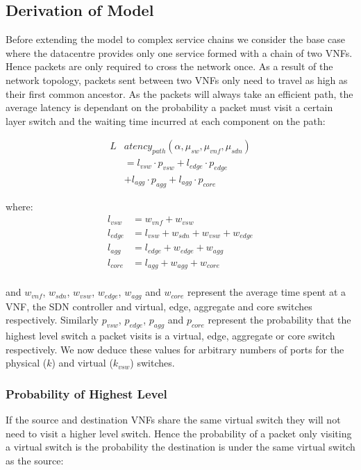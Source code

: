 \subsection{Derivation of Model}
Before extending the model to complex service chains we consider the base case where the datacentre provides only one service formed with a chain of two VNFs. Hence packets are only required to cross the network once. As a result of the network topology, packets sent between two VNFs only need to travel as high as their first common ancestor. As the packets will always take an efficient path, the average latency is dependant on the probability a packet must visit a certain layer switch and the waiting time incurred at each component on the path:

\begin{equation} 
\label{eq:mean_latency}
\begin{split}
L&atency_{path}(\alpha, \mu_{sw}, \mu_{vnf}, \mu_{sdn}) \\
		&=l_{vsw} \cdot p_{vsw} + l_{edge} \cdot p_{edge} \\
	 	&+l_{agg} \cdot p_{agg} + l_{agg} \cdot p_{core}
\end{split}
\end{equation}

\noindent where:
\begin{equation}
\begin{split}
l_{vsw} &= w_{vnf} + w_{vsw} \\
l_{edge} &= l_{vsw} + w_{sdn} + w_{vsw} + w_{edge} \\
l_{agg} &= l_{edge} + w_{edge} + w_{agg} \\
l_{core} &= l_{agg} + w_{agg} + w_{core} \\
\end{split}
\end{equation}

\noindent and $w_{vnf}$, $w_{sdn}$, $w_{vsw}$, $w_{edge}$, $w_{agg}$ and $w_{core}$ represent the average time spent at a VNF, the SDN controller and virtual, edge, aggregate and core switches respectively. Similarly $p_{vsw}$, $p_{edge}$, $p_{agg}$ and $p_{core}$ represent the probability that the highest level switch a packet visits is a virtual, edge, aggregate or core switch respectively. We now deduce these values for arbitrary numbers of ports for the physical ($k$) and virtual ($k_{vsw}$) switches.

\subsubsection{Probability of Highest Level}
If the source and destination VNFs share the same virtual switch they will not need to visit a higher level switch. Hence the probability of a packet only visiting a virtual switch is the probability the destination is under the same virtual switch as the source:


